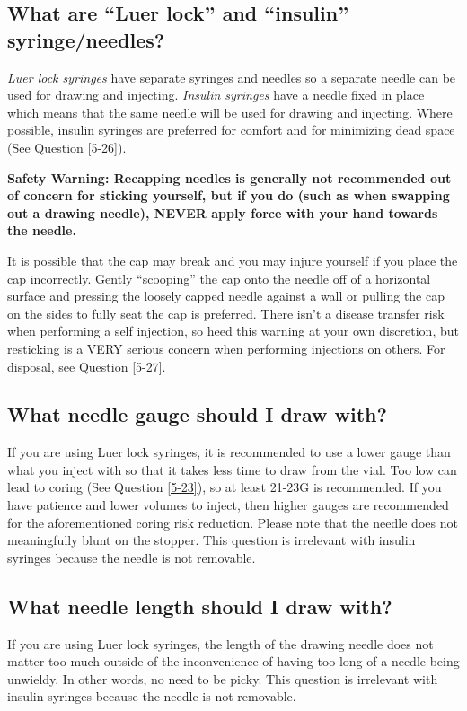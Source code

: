 \documentclass{article}
\begin{document}
\subsection{What are “Luer lock” and “insulin” syringe/needles?}\label{5-13}

\textit{Luer lock syringes} have separate syringes and needles so a separate needle can be used for drawing and injecting. \textit{Insulin syringes} have a needle fixed in place which means that the same needle will be used for drawing and injecting. Where possible, insulin syringes are preferred for comfort and for minimizing dead space (See Question \ref{5-26}).

\textbf{Safety Warning: Recapping needles is generally not recommended out of concern for sticking yourself, but if you do (such as when swapping out a drawing needle), NEVER apply force with your hand towards the needle.}

It is possible that the cap may break and you may injure yourself if you place the cap incorrectly. Gently “scooping” the cap onto the needle off of a horizontal surface and pressing the loosely capped needle against a wall or pulling the cap on the sides to fully seat the cap is preferred. There isn't a disease transfer risk when performing a self injection, so heed this warning at your own discretion, but resticking is a VERY serious concern when performing injections on others. For disposal, see Question \ref{5-27}.

\subsection{What needle gauge should I draw with?}

If you are using Luer lock syringes, it is recommended to use a lower gauge than what you inject with so that it takes less time to draw from the vial. Too low can lead to coring (See Question \ref{5-23}), so at least 21-23G is recommended. If you have patience and lower volumes to inject, then higher gauges are recommended for the aforementioned coring risk reduction. Please note that the needle does not meaningfully blunt on the stopper. This question is irrelevant with insulin syringes because the needle is not removable.

\subsection{What needle length should I draw with?}

If you are using Luer lock syringes, the length of the drawing needle does not matter too much outside of the inconvenience of having too long of a needle being unwieldy. In other words, no need to be picky. This question is irrelevant with insulin syringes because the needle is not removable.
\end{document}
